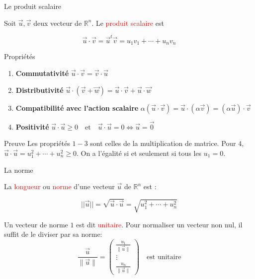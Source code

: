 \begin{parag}{Le produit scalaire}
    \begin{definition}
        Soit $\vec{u}, \vec{v}$ deux vecteur de $\mathbb{R}^n$. Le \textcolor{red}{produit scalaire} est
        \begin{formule}
            \[\vec{u}\cdot\vec{v}= \vec{u}^t\vec{v} = u_1v_1 + \cdots + u_nv_n\]
        \end{formule}
    \end{definition}
    \begin{subparag}{Propriétés}
\begin{enumerate}
    \item \textbf{Commutativité} 
    $\vec{u} \cdot \vec{v} = \vec{v} \cdot \vec{u}$
    
    \item \textbf{Distributivité} 
    $\vec{u} \cdot (\vec{v} + \vec{w}) = \vec{u} \cdot \vec{v} + \vec{u} \cdot \vec{w}$
    
    \item \textbf{Compatibilité avec l'action scalaire}
    $\alpha (\vec{u} \cdot \vec{v}) = \vec{u} \cdot (\alpha \vec{v}) = (\alpha \vec{u}) \cdot \vec{v}$
    
    \item \textbf{Positivité} 
    $\vec{u} \cdot \vec{u} \geq 0 \quad \text{et} \quad \vec{u} \cdot \vec{u} = 0 \iff \vec{u} = \vec{0}$
\end{enumerate}

    \end{subparag}
    \begin{subparag}{Preuve}
        Les propriétés $1-3$ sont celles de la multiplication de matrice. Pour $4$, $\vec{u}\cdot\vec{u} = u_1^2 + \cdots + u_n^2\geq 0.$ On a l'égalité si et seulement si tous les $u_1 = 0$.
    \end{subparag}
\end{parag}
\begin{parag}{La norme}
    \begin{definition}
        La \textcolor{red}{longueur} ou \textcolor{red}{norme} d'une vecteur $\vec{u}$ de $\mathbb{R}^n$ est :
        \begin{formule}
            \[||\vec{u}|| = \sqrt{\vec{u}\cdot\vec{u}} = \sqrt{u_1^2 + \cdots + u_n^2}\]
        \end{formule}
    \end{definition}
    Un vecteur de norme $1$ est dit \textcolor{red}{unitaire}. Pour normaliser un vecteur non nul, il suffit de le diviser par sa norme:
    \[
\frac{\vec{u}}{\|\vec{u}\|} =
\begin{pmatrix}
\frac{u_1}{\|\vec{u}\|} \\
\vdots \\
\frac{u_n}{\|\vec{u}\|}
\end{pmatrix}
\quad \text{est unitaire}
\]


\end{parag}
